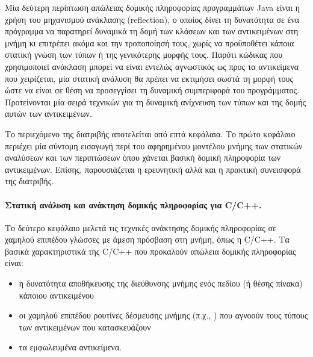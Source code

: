 \begin{itemize}
  Μία δεύτερη περίπτωση απώλειας δομικής πληροφορίας προγραμμάτων {\en
    Java} είναι η χρήση του μηχανισμού ανάκλασης ({\en reflection}), ο
  οποίος δίνει τη δυνατότητα σε ένα πρόγραμμα να παρατηρεί δυναμικά τη
  δομή των κλάσεων και των αντικειμένων στη μνήμη κι επιτρέπει ακόμα
  και την τροποποίησή τους, χωρίς να προϋποθέτει κάποια στατική γνώση
  των τύπων ή της γενικότερης μορφής τους.  Παρότι κώδικας που
  χρησιμοποιεί ανάκλαση μπορεί να είναι εντελώς αγνωστικός ως προς τα
  αντικείμενα που χειρίζεται, μία στατική ανάλυση θα πρέπει να
  εκτιμήσει σωστά τη μορφή τους ώστε να είναι σε θέση να προσεγγίσει
  τη δυναμική συμπεριφορά του προγράμματος.  Προτείνονται μία σειρά
  τεχνικών για τη δυναμική ανίχνευση των τύπων και της δομής αυτών των
  αντικειμένων.
\end{itemize}
 
Το περιεχόμενο της διατριβής αποτελείται από επτά κεφάλαια.  Το πρώτο
κεφάλαιο περιέχει μία σύντομη εισαγωγή περί του αφηρημένου μοντέλου
μνήμης των στατικών αναλύσεων και των περιπτώσεων όπου χάνεται βασική
δομική πληροφορία των αντικειμένων.  Επίσης, παρουσιάζεται η
ερευνητική αλλά και η πρακτική συνεισφορά της διατριβής.



\paragraph*{Στατική ανάλυση και ανάκτηση δομικής πληροφορίας για {\en C/C++}.}
Το δεύτερο κεφάλαιο μελετά τις τεχνικές ανάκτησης δομικής πληροφορίας
σε χαμηλού επιπέδου γλώσσες με άμεση πρόσβαση στη μνήμη, όπως η {\en
  C/C++}.
%
Τα βασικά χαρακτηριστικά της {\en C/C++} που προκαλούν απώλεια δομικής
πληροφορίας είναι:
\begin{itemize}[--]
\item η δυνατότητα αποθήκευσης της διεύθυνσης μνήμης ενός πεδίου (ή
  θέσης πίνακα) κάποιου αντικειμένου
\item οι χαμηλού επιπέδου ρουτίνες δέσμευσης μνήμης (π.χ., {\en
    }) που αγνοούν τους τύπους των αντικειμένων που
  κατασκευάζουν
\item τα εμφωλευμένα αντικείμενα.
\end{itemize}

